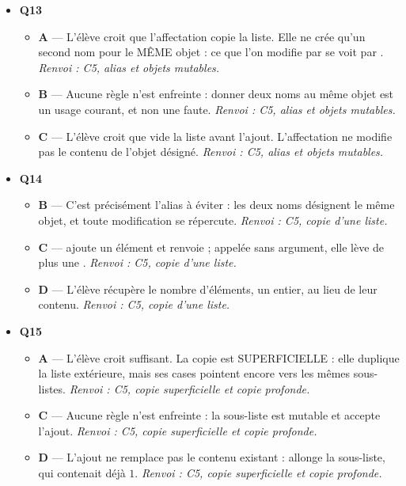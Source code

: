 \begin{itemize}
\begin{itemize}
  \end{itemize}
  \item \textbf{Q13}
  \begin{itemize}
    \item \textbf{A} — L'élève croit que l'affectation copie la liste. Elle ne crée qu'un second nom pour le MÊME objet : ce que l'on modifie par  se voit par . \emph{Renvoi : C5, alias et objets mutables.}
    \item \textbf{B} — Aucune règle n'est enfreinte : donner deux noms au même objet est un usage courant, et non une faute. \emph{Renvoi : C5, alias et objets mutables.}
    \item \textbf{C} — L'élève croit que  vide la liste avant l'ajout. L'affectation ne modifie pas le contenu de l'objet désigné. \emph{Renvoi : C5, alias et objets mutables.}
  \end{itemize}
  \item \textbf{Q14}
  \begin{itemize}
    \item \textbf{B} — C'est précisément l'alias à éviter : les deux noms désignent le même objet, et toute modification se répercute. \emph{Renvoi : C5, copie d'une liste.}
    \item \textbf{C} —  ajoute un élément et renvoie  ; appelée sans argument, elle lève de plus une . \emph{Renvoi : C5, copie d'une liste.}
    \item \textbf{D} — L'élève récupère le nombre d'éléments, un entier, au lieu de leur contenu. \emph{Renvoi : C5, copie d'une liste.}
  \end{itemize}
  \item \textbf{Q15}
  \begin{itemize}
    \item \textbf{A} — L'élève croit  suffisant. La copie est SUPERFICIELLE : elle duplique la liste extérieure, mais ses cases pointent encore vers les mêmes sous-listes. \emph{Renvoi : C5, copie superficielle et copie profonde.}
    \item \textbf{C} — Aucune règle n'est enfreinte : la sous-liste est mutable et accepte l'ajout. \emph{Renvoi : C5, copie superficielle et copie profonde.}
    \item \textbf{D} — L'ajout ne remplace pas le contenu existant :  allonge la sous-liste, qui contenait déjà $1$. \emph{Renvoi : C5, copie superficielle et copie profonde.}
  \end{itemize}

\end{itemize}
